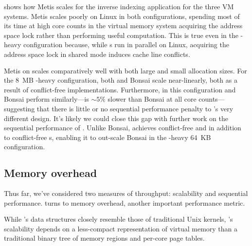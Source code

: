 \begin{figure}
  \centering
  
  \label{fig:metis}
\end{figure}


 shows how Metis scales for the inverse indexing
application for the three VM systems.
%
Metis scales poorly on Linux in both configurations, spending most of
its time at high core counts in the virtual memory system acquiring
the address space lock rather than performing useful computation.
%
This is true even in the -heavy configuration because,
while s run in parallel on Linux, acquiring the
address space lock in shared mode induces cache line conflicts.

Metis on \sys scales comparatively well with both large and small
allocation sizes.
%
For the 8~MB -heavy configuration, both \sys and
Bonsai scale near-linearly, both as a result of conflict-free
 implementations.
%
Furthermore, in this configuration \sys and Bonsai perform
similarly---\sys is $\sim5\%$ slower than Bonsai at all core
counts---suggesting that there is little or no sequential performance
penalty to \vm's very different design.  It's likely we could close
this gap with further work on the sequential performance of \sys.
%
Unlike Bonsai, \sys achieves conflict-free  and
 in addition to conflict-free s, enabling
it to out-scale Bonsai in the -heavy 64~KB configuration.


\subsection{Memory overhead}
\label{sec:eval:memory}

Thus far, we've considered two measures of throughput: scalability and
sequential performance.   turns to memory
overhead, another important performance metric.

While \fs's data structures closely resemble those of traditional Unix
kernels, \vm's scalability depends on a less-compact representation of
virtual memory than a traditional binary tree of memory regions and
per-core page tables.

